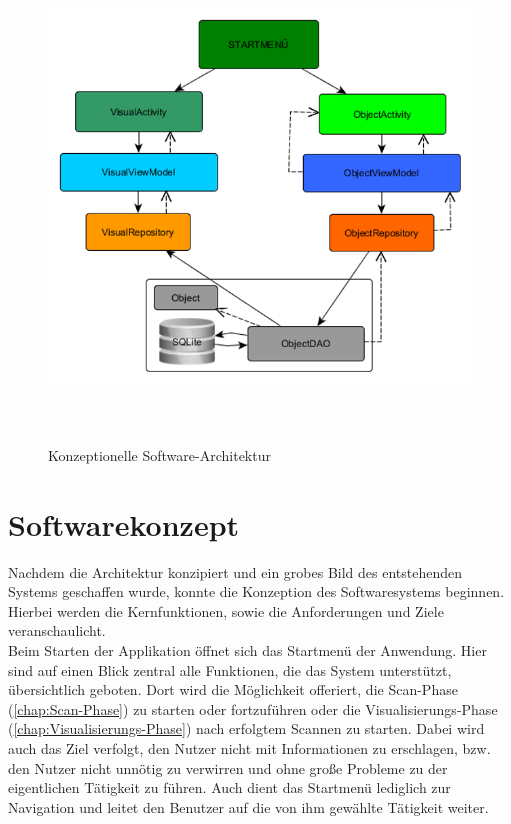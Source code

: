 \begin{figure}[hbt!]
    \centering
    \includegraphics[width=13cm,height=13cm,keepaspectratio]{3Konzeption/Bilder/architektur_konzept.png}
    \caption{Konzeptionelle Software-Architektur}
    \label{pic:architectur}
\end{figure}
\pagebreak
\section{Softwarekonzept}
\label{chap:Softwarekonzept}
Nachdem die Architektur konzipiert und ein grobes Bild des entstehenden Systems geschaffen wurde, konnte die Konzeption des 
Softwaresystems beginnen. Hierbei werden die Kernfunktionen, sowie die Anforderungen und Ziele veranschaulicht.
\\ 
\linebreak 
Beim Starten der Applikation öffnet sich das Startmenü der Anwendung. Hier sind auf einen Blick zentral alle Funktionen, die das System 
unterstützt, übersichtlich geboten. Dort wird die Möglichkeit offeriert, die Scan-Phase (\ref{chap:Scan-Phase}) zu starten oder fortzuführen 
oder die Visualisierungs-Phase (\ref{chap:Visualisierungs-Phase}) nach erfolgtem Scannen zu starten. Dabei wird auch das Ziel verfolgt, den 
Nutzer nicht mit Informationen zu erschlagen, bzw. den Nutzer nicht unnötig zu verwirren und ohne große Probleme zu der eigentlichen Tätigkeit 
zu führen. Auch dient das Startmenü lediglich zur Navigation und leitet den Benutzer auf die von ihm gewählte Tätigkeit weiter.  
